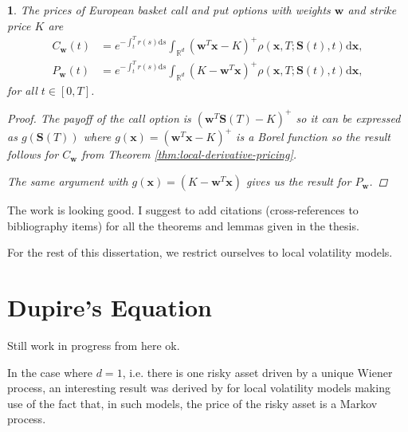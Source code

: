 \documentclass[english]{article}
\newcommand{\comment}[1]{\color{blue}#1\color{black}}
\newcommand{\tomcomment}[1]{\color{orange}#1\color{black}}
\numberwithin{equation}{section}
\numberwithin{figure}{section}
\theoremstyle{bolddescit}
\theoremstyle{definition}
\theoremstyle{definition}
\theoremstyle{plain}
\theoremstyle{plain}
\newtheorem{corollary}[theorem]{\protect\corollaryname}
\theoremstyle{bolddesc}
\theoremstyle{plain}
\theoremstyle{remark}
\providecommand{\corollaryname}{Corollary}
\begin{document}
\begin{corollary}\label{cor:local-option-pricing}
  The prices of European basket call and put options with weights $\mathbf{w}$ and strike price $K$ are
  \begin{align*}
    C_\mathbf{w}(t)
    &= e^{-\int_t^T r(s) \mathrm{d}s} \int_{\mathbb{R}^d} \left(\mathbf{w}^T\mathbf{x} - K\right)^+ \rho(\mathbf{x},T;\mathbf{S}(t),t) \mathrm{d}\mathbf{x},\\
    P_\mathbf{w}(t)
    &= e^{-\int_t^T r(s) \mathrm{d}s} \int_{\mathbb{R}^d} \left(K - \mathbf{w}^T\mathbf{x}\right)^+ \rho(\mathbf{x},T;\mathbf{S}(t),t) \mathrm{d}\mathbf{x},
  \end{align*}
  for all $t \in [0,T]$.

  \begin{proof}
    The payoff of the call option is $(\mathbf{w}^T \mathbf{S}(T) - K)^+$ so it can be expressed as $g(\mathbf{S}(T))$ where $g(\mathbf{x}) = (\mathbf{w}^T \mathbf{x} - K)^+$ is a Borel function so the result follows for $C_\mathbf{w}$ from Theorem \ref{thm:local-derivative-pricing}.

    The same argument with $g(\mathbf{x}) = (K - \mathbf{w}^T \mathbf{x})$ gives us the result for $P_\mathbf{w}$.
  \end{proof}
\end{corollary}

\comment{The work is looking good. I suggest to add citations (cross-references to bibliography items) for all the theorems and lemmas given in the thesis.}

For the rest of this dissertation, we restrict ourselves to local volatility models.

\section{Dupire's Equation}

\tomcomment{Still work in progress from here} %
\comment{ok.}


In the case where $d=1$, i.e. there is one risky asset driven by a unique Wiener process, an interesting result was derived by \textcite{dupire_pricing_1994} for local volatility models making use of the fact that, in such models, the price of the risky asset is a Markov process.
\end{document}
